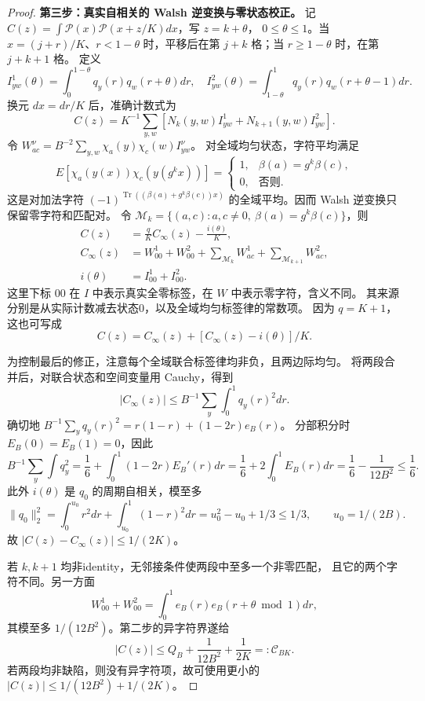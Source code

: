 \begin{proof}
\textbf{第三步：真实自相关的 Walsh 逆变换与零状态校正。}
记 $C(z)=\int\mathcal P(x)\mathcal P(x+z/K)dx$，写 $z=k+\theta$，
$0\le\theta\le1$。当 $x=(j+r)/K$、$r<1-\theta$ 时，平移后在第
$j+k$ 格；当 $r\ge1-\theta$ 时，在第 $j+k+1$ 格。
定义
\[
 I^1_{yw}(\theta)=\int_0^{1-\theta}q_y(r)q_w(r+\theta)dr,
 \quad I^2_{yw}(\theta)=\int_{1-\theta}^1q_y(r)q_w(r+\theta-1)dr.
\]
换元 $dx=dr/K$ 后，准确计数式为
\[
 C(z)=K^{-1}\sum_{y,w}[N_k(y,w)I^1_{yw}+N_{k+1}(y,w)I^2_{yw}].
\]
令 $W^\nu_{ac}=B^{-2}\sum_{y,w}\chi_a(y)\chi_c(w)I^\nu_{yw}$。
对全域均匀状态，字符平均满足
\[
 E[\chi_a(y(x))\chi_c(y(g^kx))]
 =\begin{cases}1,&\beta(a)=g^k\beta(c),\\0,&\text{否则}.
 \end{cases}
\]
这是对加法字符 $(-1)^{\operatorname{Tr}((\beta(a)+g^k\beta(c))x)}$
的全域平均。因而 Walsh 逆变换只保留零字符和匹配对。
令 $\mathcal M_k=\{(a,c):a,c\ne0,\ \beta(a)=g^k\beta(c)\}$，则
\begin{align*}
 C(z)&=\frac qK C_\infty(z)-\frac{i(\theta)}K,\\
 C_\infty(z)&=W^1_{00}+W^2_{00}
 +\sum_{\mathcal M_k}W^1_{ac}+\sum_{\mathcal M_{k+1}}W^2_{ac},\\
 i(\theta)&=I^1_{00}+I^2_{00}.
\end{align*}
这里下标 $00$ 在 $I$ 中表示真实全零标签，在 $W$ 中表示零字符，含义不同。
其来源分别是从实际计数减去状态0，以及全域均匀标签律的常数项。
因为 $q=K+1$，这也可写成
\[
 C(z)=C_\infty(z)+[C_\infty(z)-i(\theta)]/K.
\]

为控制最后的修正，注意每个全域联合标签律均非负，且两边际均匀。
将两段合并后，对联合状态和空间变量用 Cauchy，得到
\[
 |C_\infty(z)|\le B^{-1}\sum_y\int_0^1q_y(r)^2dr.
\]
确切地 $B^{-1}\sum_yq_y(r)^2=r(1-r)+(1-2r)e_B(r)$。
分部积分时 $E_B(0)=E_B(1)=0$，因此
\[
 B^{-1}\sum_y\int q_y^2
 =\frac16+\int_0^1(1-2r)E_B'(r)dr
 =\frac16+2\int_0^1E_B(r)dr
 =\frac16-\frac1{12B^2}\le\frac16.
\]
此外 $i(\theta)$ 是 $q_0$ 的周期自相关，模至多
\[
 \|q_0\|_2^2=\int_0^{u_0}r^2dr+\int_{u_0}^1(1-r)^2dr
 =u_0^2-u_0+1/3\le1/3,\qquad u_0=1/(2B).
\]
故 $|C(z)-C_\infty(z)|\le1/(2K)$。

若 $k,k+1$ 均非identity，无邻接条件使两段中至多一个非零匹配，
且它的两个字符不同。另一方面
\[
 W^1_{00}+W^2_{00}=\int_0^1e_B(r)e_B(r+\theta\bmod1)dr,
\]
其模至多 $1/(12B^2)$。第二步的异字符界遂给
\begin{equation}\label{eq:paperfarC}
 |C(z)|\le Q_B+\frac1{12B^2}+\frac1{2K}=:\mathcal C_{BK}.
\end{equation}
若两段均非缺陷，则没有异字符项，故可使用更小的
$|C(z)|\le1/(12B^2)+1/(2K)$。


\end{proof}
